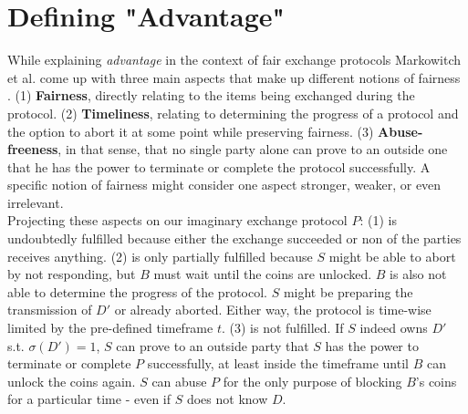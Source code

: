 \documentclass{cacthesis}
\begin{document}
        \section{Defining "Advantage"}
        While explaining \textit{advantage} in the context of fair exchange protocols Markowitch et al. come up with three main aspects that make up different notions of fairness \cite{10.1007/3-540-36552-4_31}. (1) \textbf{Fairness}, directly relating to the items being exchanged during the protocol. (2) \textbf{Timeliness}, relating to determining the progress of a protocol and the option to abort it at some point while preserving fairness. (3) \textbf{Abuse-freeness}, in that sense, that no single party alone can prove to an outside one that he has the power to terminate or complete the protocol successfully. A specific notion of fairness might consider one aspect stronger, weaker, or even irrelevant. \\
        Projecting these aspects on our imaginary exchange protocol $P$: (1) is undoubtedly fulfilled because either the exchange succeeded or non of the parties receives anything. (2) is only partially fulfilled because $S$ might be able to abort by not responding, but $B$ must wait until the coins are unlocked. $B$ is also not able to determine the progress of the protocol. $S$ might be preparing the transmission of $D'$ or already aborted. Either way, the protocol is time-wise limited by the pre-defined timeframe $t$. (3) is not fulfilled. If $S$ indeed owns $D'$ s.t. $\sigma\left( D'\right) =1$, $S$ can prove to an outside party that $S$ has the power to terminate or complete $P$ successfully, at least inside the timeframe until $B$ can unlock the coins again. $S$ can abuse $P$ for the only purpose of blocking $B$'s coins for a particular time - even if $S$ does not know $D$.
        
\end{document}
